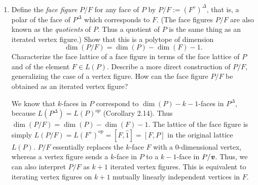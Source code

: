 \documentclass{article}
\begin{document}
\begin{enumerate}
\begin{solution}
\begin{enumerate}[label=(\roman*)]
    \item Assume $\dim(P) = \dim(P')$ but $M(P) \neq M(P')$. Thus there exists adjacent two facets $F_1', F_2'$ in $P'$ where the corresponding $F_1 \in P$ forms a facet, but $F_2$ doesn't. Consider the ridge formed by $F_1' \cap F_2'$, which is a facet for $F_1'$. Notice $\dim(F_1') = \dim(F_1) = \dim(P)-1$, so we can simply induct on the dimension of the polytope. The base case is trivial and thus we are done.

    \item Consider $C_3$, the $3$-cube, and $C_4(8)$, a cyclic polytope. The facets of $C_4(8)$ are, by Gale's evenness condition
    \[\{1234,1245,1256,1267,1278,2345,2356,2367,2378,\]
    \[3456,3467,3478,4567,4578,5678,1238,1348,1458,1468,1678 \}\]

    Following Ziegler's suggest labeling of $C_3$, its facets are
    \[\{1234, 1278, 2367, 3456,1458, 5678\}\]

    and one sees that the facets of $C_3$ are a subset of the facets of $C_4(8)$. The fact that $\dim(C_3) = 3 < 4 = \dim(C_4(8))$ concludes the proof.

    \item We will save this for later, either after chapter 8 or when I learn some homotopy theory.

\end{enumerate} 
\end{solution}

\item Define the \emph{face figure} $P/F$ for any face of $P$ by $ P/F := (F^\diamond)^\Delta$, that is, a polar of the face of $P^\Delta$ which corresponds to $F$. (The face figures $P/F$ are also known as the \emph{quotients} of $P$. Thus a quotient of $P$ is the same thing as an iterated vertex figure.) Show that this is a polytope of dimension 
\[ \dim(P/F) = \dim(P) - \dim(F) - 1. \] 
Characterize the face lattice of a face figure in terms of the face lattice of $P$ and of the element $F \in L(P)$. Describe a more direct construction of $P/F$, generalizing the case of a vertex figure. How can the face figure $P/F$ be obtained as an iterated vertex figure?

\begin{solution}
    We know that $k$-faces in $P$ correspond to $\dim(P) - k - 1$-faces in $P^{\Delta}$, because $L(P^\Delta) = L(P)^{op}$ (Corollary 2.14). Thus $\dim(P/F) = \dim(P) - \dim(F) - 1$. The lattice of the face figure is simply $L(P/F) = L(F^\diamond)^{op} = [F, \hat1] = [F,P]$ in the original lattice $L(P)$. $P/F$ essentially replaces the $k$-face $F$ with a $0$-dimensional vertex, whereas a vertex figure sends a $k$-face in $P$ to a $k-1$-face in $P/\textbf{\textit{v}}$. Thus, we can also interpret $P/F$ as $k+1$ iterated vertex figures. This is equivalent to iterating vertex figures on $k+1$ mutually linearly independent vertices in $F$.
\end{solution}


\end{enumerate}
\end{document}
